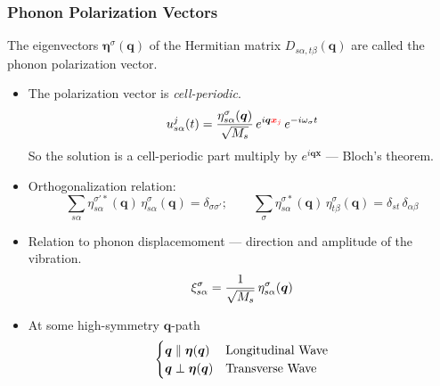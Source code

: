 \begin{frame}
  \frametitle{Phonon Polarization Vectors}

  The eigenvectors $\boldsymbol{\eta}^\sigma(\boldsymbol{q})$ of the Hermitian
  matrix $D_{s\alpha,t\beta}(\boldsymbol{q})$ are called the phonon polarization
  vector.

  \begin{itemize}
    \setlength\itemsep{\smallskipamount}
    
    \item The polarization vector is \emph{cell-periodic}.
    \begin{equation*}
        {u}_{s\alpha}^j(t) =
        {{\eta}^\sigma_{s\alpha}(\boldsymbol{q}) \over \sqrt{M_s}}\,
        e^{i\boldsymbol{q}\mathcolor{red}{\boldsymbol{x}_j}} \,e^{- i\omega_\sigma t}
    \end{equation*}
    So the solution is a cell-periodic part multiply by
    $e^{i\boldsymbol{q}\boldsymbol{x}}$ --- Bloch's theorem.

    \item Orthogonalization relation:
    \begin{equation*}
      \sum_{s\alpha}
      \eta^{\sigma'*}_{s\alpha}(\boldsymbol{q})\,
      \eta^{\sigma}_{s\alpha}(\boldsymbol{q})
      = \delta_{\sigma\sigma'};
      \qquad
      \sum_{\sigma}
      \eta^{\sigma*}_{s\alpha}(\boldsymbol{q})\,
      \eta^{\sigma}_{t\beta}(\boldsymbol{q})
      = \delta_{st} \, \delta_{\alpha\beta}
    \end{equation*}
    \item Relation to phonon displacemoment --- direction and amplitude of the vibration.
      \begin{equation*}
      \xi^{\sigma}_{s\alpha} = {1\over\sqrt{M_s}}\,\eta^{\sigma}_{s\alpha}(\boldsymbol{q})
      \end{equation*}
      
    \item At some high-symmetry $\boldsymbol{q}$-path
      \begin{equation*}
        \begin{cases}
          \boldsymbol{q} \parallel \boldsymbol{\eta}(\boldsymbol{q}) & \text{Longitudinal Wave} \cr
          \boldsymbol{q} \perp     \boldsymbol{\eta}(\boldsymbol{q}) & \text{Transverse Wave} \cr
        \end{cases}
      \end{equation*}
  \end{itemize}
\end{frame}

